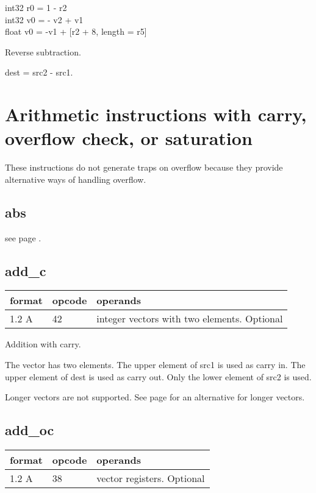 \documentclass[forwardcom.tex]{subfiles}
\begin{document}
int32 r0 = 1 - r2 \\
int32 v0 = - v2 + v1 \\
float v0 = -v1 + [r2 + 8, length = r5]
\vv

Reverse subtraction.
\vv

dest = src2 - src1.
\vv


\section{Arithmetic instructions with carry, overflow check, or saturation}
These instructions do not generate traps on overflow because they provide alternative ways of handling overflow.
\vv

\subsection{abs}
see page \pageref{table:absInstruction}.
\vv

\subsection{add\_c}
\label{table:addCInstruction}
\begin{tabular}{|p{12mm}|p{15mm}|p{100mm}|}
\hline
\bfseries format & \bfseries opcode & \bfseries operands \\ \hline
1.2 A & 42 & integer vectors with two elements. Optional \\ \hline
\end{tabular}
\vv

Addition with carry.
\vv

The vector has two elements. The upper element of src1 is used as carry in. The upper element of dest is used as carry out. Only the lower element of src2 is used.
\vv

Longer vectors are not supported. See page 
\pageref{highPrecisionArithmetic} for an alternative for longer vectors.
\vv

\subsection{add\_oc}
\label{table:addOcInstruction}
\begin{tabular}{|p{12mm}|p{15mm}|p{100mm}|}
\hline
\bfseries format & \bfseries opcode & \bfseries operands \\ \hline
1.2 A & 38 & vector registers. Optional \\ \hline
\end{tabular}
\vv
\end{document}
